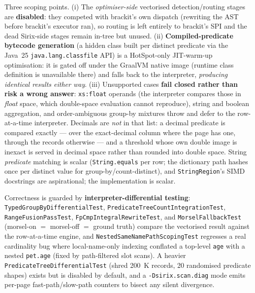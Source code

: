 \documentclass[11pt,a4paper,oneside]{report}
\theoremstyle{sirixthm}
\newcommand{\code}[1]{\texttt{#1}}
\begin{document}
Three scoping points. (i) The \emph{optimiser-side} vectorised detection/routing stages are
\textbf{disabled}: they competed with brackit's own dispatch (rewriting the AST before brackit's
executor ran), so routing is left entirely to brackit's SPI and the dead Sirix-side stages remain
in-tree but unused. (ii) \textbf{Compiled-predicate bytecode generation} (a hidden class built per
distinct predicate via the Java~25 \code{java.lang.classfile} API) is a HotSpot-only JIT-warm-up
optimisation: it is gated off under the GraalVM native image (runtime class definition is unavailable
there) and falls back to the interpreter, \emph{producing identical results either way}. (iii)
Unsupported cases \textbf{fail closed rather than risk a wrong answer}: \code{xs:float} operands
(the interpreter compares those in \emph{float} space, which double-space evaluation cannot
reproduce), string and boolean aggregation, and order-ambiguous group-by mixtures throw and defer to
the row-at-a-time interpreter. Decimals are \emph{not} in that list: a decimal predicate is compared
exactly --- over the exact-decimal column where the page has one, through the records otherwise ---
and a threshold whose own double image is inexact is served in decimal space rather than rounded
into double space. String \emph{predicate} matching is
scalar (\code{String.equals} per row; the dictionary path hashes once per distinct value for
group-by/count-distinct), and \code{StringRegion}'s SIMD docstrings are aspirational; the
implementation is scalar.

Correctness is guarded by \textbf{interpreter-differential testing}:
\code{TypedGroupByDifferentialTest}, \code{PredicateTreeCountIntegrationTest},
\code{RangeFusionPassTest}, \code{FpCmpIntegralRewriteTest}, and \code{MorselFallbackTest}
(morsel-on $=$ morsel-off $=$ ground truth) compare the vectorised result against the row-at-a-time
engine, and \code{NestedSameNamePathScopingTest} regresses a real cardinality bug where local-name-only
indexing conflated a top-level \code{age} with a nested \code{pet.age} (fixed by path-filtered slot
scans). A heavier \code{PredicateTreeDifferentialTest} (shred 200~K records, 20 randomised predicate
shapes) exists but is disabled by default, and a \code{-Dsirix.scan.diag} mode emits per-page
fast-path/slow-path counters to bisect any silent divergence.
\end{document}
